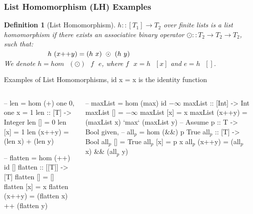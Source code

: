 \documentclass{beamer}
\renewcommand{\emph}[1]{\textcolor{structure}{#1}}
\newcommand{\emp}[1]{\textcolor{DikuRed}{ #1}}
\newcommand{\mymath}[1]{$ #1 $}
\newcommand{\myindx}[1]{_{#1}}
\newtheorem{mydef}{Definition}
\begin{document}
\begin{frame}[fragile,t]
  \frametitle{List Homomorphism (LH) Examples}


\begin{mydef}[List Homomorphism]\label{LHomDef}
$h :: [T_1] \rightarrow T_2$ over finite lists is a {\em list homomorphism}
if there exists an associative binary operator $\odot :: T_2 \rightarrow T_2 \rightarrow T_2$,
such that: \\
$\mbox{ }\mbox{ }\mbox{ }\mbox{ }\mbox{ }\mbox{ }\mbox{ }\mbox{ }\mbox{ }$
\emp{$h \mbox{ } (x{\tt ++}y) = (h\mbox{ }x)\mbox{ }\odot\mbox{ }(h\mbox{ }y)$} \\
We denote $h = hom \mbox{ }(\odot) \mbox{ }f\mbox{ }e$, where $f\mbox{ }x = h\mbox{ }[x]$ and $e = h\mbox{ }[]$. 
\end{mydef}

\begin{block}{Examples of List Homomorphisms, id x = x is the identity function}
\vspace{-2ex}
\begin{columns}
\begin{colorcode}[fontsize=\scriptsize]
-- \emp{len} = \emp{hom (+) one 0}, one x = 1
len :: [T] -> Integer
len []     = \emp{0}
len [x]    = \emp{1}
\emph{len} (x++y) = (\emph{len} x) \emp{+} (\emph{len} y)

-- \emph{flatten} = \emp{hom (++) id []}
flatten :: [[T]] -> [T]
flatten []     = \emp{[]}
flatten [x]    = \emp{x}
\emph{flatten} (x++y) = (\emph{flatten} x) \emp{++} 
                 (\emph{flatten} y)
\end{colorcode}
\begin{colorcode}[fontsize=\scriptsize]
-- \emph{maxList} = \emp{hom (max) id \mymath{-\infty}} 
maxList :: [Int] -> Int
maxList []     = \emp{\mymath{-\infty}}
maxList [x]    = \emp{x}
\emph{maxList} (x++y) = (\emph{maxList} x) \emp{`max`} 
                 (\emph{maxList} y)
-- Assume p :: T -> Bool given,
-- \emph{all\mymath{\myindx{p}}} = \emp{hom (&&) p True}
all\mymath{\myindx{p}} :: [T] -> Bool
all\mymath{\myindx{p}} []     = \emp{True}
all\mymath{\myindx{p}} [x]    = \emp{p x} 
\emph{all\mymath{\myindx{p}}} (x++y) = (\emph{all\mymath{\myindx{p}}} x) \emp{&&} (\emph{all\mymath{\myindx{p}}} y)
\end{colorcode}
\end{columns}
\end{block}


\end{frame}
\end{document}
